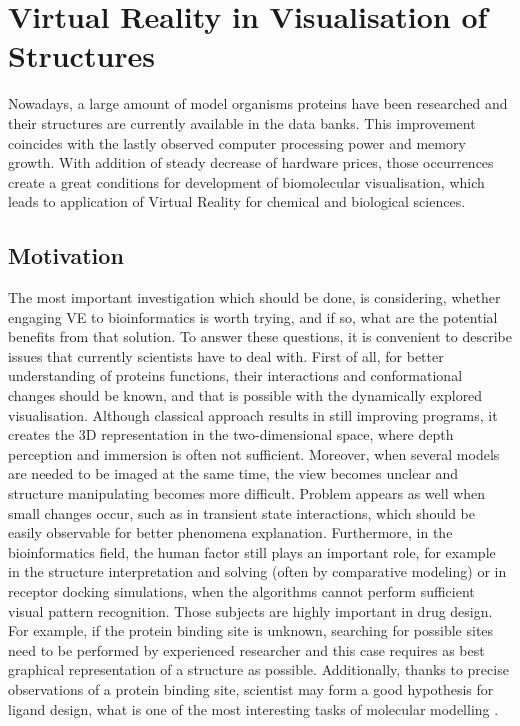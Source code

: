 \section{Virtual Reality in Visualisation of Structures}%
Nowadays, a large amount of model organisms proteins have been researched and their structures are currently available in the data banks. This improvement coincides with the lastly observed computer processing power and memory growth. With addition of steady decrease of hardware prices, those occurrences create a great conditions for development of biomolecular visualisation, which leads to application of Virtual Reality for chemical and biological sciences.

\subsection{Motivation}
The most important investigation which should be done, is considering, whether engaging VE to bioinformatics is worth trying, and if so, what are the potential benefits from that solution. To answer these questions, it is convenient to describe issues that currently scientists have to deal with. First of all, for better understanding of proteins functions, their interactions and conformational changes should be known, and that is possible with the dynamically explored visualisation. Although classical approach results in still improving programs, it creates the 3D representation in the two-dimensional space, where depth perception and immersion is often not sufficient. Moreover, when several models are needed to be imaged at the same time, the view becomes unclear and structure manipulating becomes more difficult. Problem appears as well when small changes occur, such as in transient state interactions, which should be easily observable for better phenomena explanation. Furthermore, in the bioinformatics field, the human factor still plays an important role, for example in the structure interpretation and solving (often by comparative modeling) or in receptor docking simulations, when the algorithms cannot perform sufficient visual pattern recognition. Those subjects are highly important in drug design. For example, if the protein binding site is unknown, searching for possible sites need to be performed by experienced researcher and this case requires as best graphical representation of a structure as possible. Additionally, thanks to precise observations of a protein binding site, scientist may form a good hypothesis for ligand design, what is one of the most interesting tasks of molecular modelling \citep{Anderson99}. 

